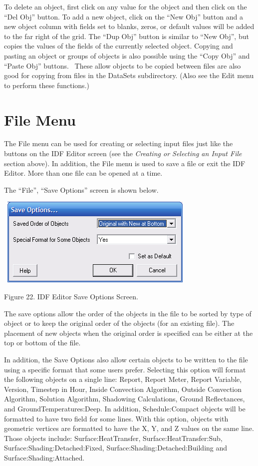 To delete an object, first click on any value for the object and then click on the ``Del Obj'' button. To add a new object, click on the ``New Obj'' button and a new object column with fields set to blanks, zeros, or default values will be added to the far right of the grid. The ``Dup Obj'' button is similar to ``New Obj'', but copies the values of the fields of the currently selected object. Copying and pasting an object or groups of objects is also possible using the ``Copy Obj'' and ``Paste Obj'' buttons.~ These allow objects to be copied between files are also good for copying from files in the DataSets subdirectory. (Also see the Edit menu to perform these functions.)

\section{File Menu}\label{file-menu-000}

The File menu can be used for creating or selecting input files just like the buttons on the IDF Editor screen (see the \emph{Creating or Selecting an Input File} section above). In addition, the File menu is used to save a file or exit the IDF Editor. More than one file can be opened at a time.

The ``File'', ``Save Options'' screen is shown below.

~\includegraphics{media/image022.png}

Figure 22. IDF Editor Save Options Screen.

The save options allow the order of the objects in the file to be sorted by type of object or to keep the original order of the objects (for an existing file). The placement of new objects when the original order is specified can be either at the top or bottom of the file.

In addition, the Save Options also allow certain objects to be written to the file using a specific format that some users prefer. Selecting this option will format the following objects on a single line: Report, Report Meter, Report Variable, Version, Timestep in Hour, Inside Convection Algorithm, Outside Convection Algorithm, Solution Algorithm, Shadowing Calculations, Ground Reflectances, and GroundTemperatures:Deep. In addition, Schedule:Compact objects will be formatted to have two field for some lines. With this option, objects with geometric vertices are formatted to have the X, Y, and Z values on the same line. Those objects include: Surface:HeatTransfer, Surface:HeatTransfer:Sub, Surface:Shading:Detached:Fixed, Surface:Shading:Detached:Building and Surface:Shading:Attached.

